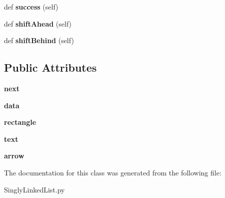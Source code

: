 \begin{DoxyCompactItemize}
\item 
def {\bfseries success} (self)\hypertarget{class_singly_linked_list_1_1_singly_linked_list_node_a93b77e8258a5fc14305a11ba27eab8f3}{}\label{class_singly_linked_list_1_1_singly_linked_list_node_a93b77e8258a5fc14305a11ba27eab8f3}

\item 
def {\bfseries shift\+Ahead} (self)\hypertarget{class_singly_linked_list_1_1_singly_linked_list_node_aabccf02e114b5abb5fd40a7cc7ab240b}{}\label{class_singly_linked_list_1_1_singly_linked_list_node_aabccf02e114b5abb5fd40a7cc7ab240b}

\item 
def {\bfseries shift\+Behind} (self)\hypertarget{class_singly_linked_list_1_1_singly_linked_list_node_ab7d981efc16e32b20f6653aa579f3f3b}{}\label{class_singly_linked_list_1_1_singly_linked_list_node_ab7d981efc16e32b20f6653aa579f3f3b}

\end{DoxyCompactItemize}
\subsection*{Public Attributes}
\begin{DoxyCompactItemize}
\item 
{\bfseries next}\hypertarget{class_singly_linked_list_1_1_singly_linked_list_node_a4dafb60af09bd5be70622ab7e9eeb743}{}\label{class_singly_linked_list_1_1_singly_linked_list_node_a4dafb60af09bd5be70622ab7e9eeb743}

\item 
{\bfseries data}\hypertarget{class_singly_linked_list_1_1_singly_linked_list_node_a4ecec4767ec2df1e1985683f8986bdf2}{}\label{class_singly_linked_list_1_1_singly_linked_list_node_a4ecec4767ec2df1e1985683f8986bdf2}

\item 
{\bfseries rectangle}\hypertarget{class_singly_linked_list_1_1_singly_linked_list_node_a90f38d27b040c3c09460bbfbac48463e}{}\label{class_singly_linked_list_1_1_singly_linked_list_node_a90f38d27b040c3c09460bbfbac48463e}

\item 
{\bfseries text}\hypertarget{class_singly_linked_list_1_1_singly_linked_list_node_a322a731f88a73f394b4b775eac6acef6}{}\label{class_singly_linked_list_1_1_singly_linked_list_node_a322a731f88a73f394b4b775eac6acef6}

\item 
{\bfseries arrow}\hypertarget{class_singly_linked_list_1_1_singly_linked_list_node_afc27fef68ee2fd5b4a25b8ff4368e12c}{}\label{class_singly_linked_list_1_1_singly_linked_list_node_afc27fef68ee2fd5b4a25b8ff4368e12c}

\end{DoxyCompactItemize}


The documentation for this class was generated from the following file\+:\begin{DoxyCompactItemize}
\item 
Singly\+Linked\+List.\+py\end{DoxyCompactItemize}
